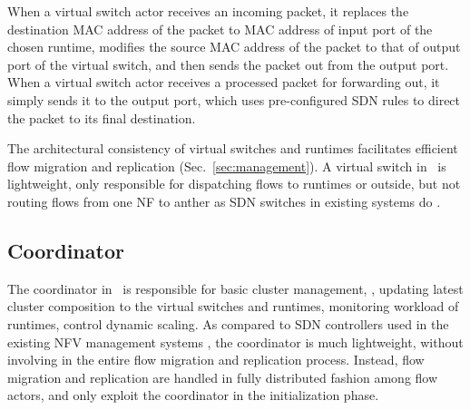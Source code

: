 When a virtual switch actor receives an incoming packet, it replaces the destination MAC address of the packet to MAC address of input port of the chosen runtime, modifies the source MAC address of the packet to that of output port of the virtual switch, and then sends the packet out from the output port. When a virtual switch actor receives a processed packet for forwarding out, %
 it simply sends it to the output port, which uses pre-configured SDN rules to direct the packet to its final destination. %


The architectural consistency of virtual switches and runtimes facilitates efficient flow migration and replication (Sec.~\ref{sec:management}). %
 A virtual switch in \nfactor~is lightweight, only responsible for dispatching flows to runtimes or outside, but not routing flows from one NF to anther as SDN switches in existing systems do \cite{gember2012stratos, gember2015opennf}.





\subsection{Coordinator}
\label{sec:coordinator}

The coordinator in \nfactor~is responsible for basic cluster management, %
\eg, updating latest cluster composition to the virtual switches and runtimes, monitoring workload of runtimes, control dynamic scaling. %
As compared to SDN controllers used in the existing NFV management systems \cite{gember2015opennf, rajagopalan2013split}%
, the coordinator is much lightweight, without involving in the entire flow migration and replication process.%
 Instead, flow migration and replication are handled in fully distributed fashion among flow actors, and only exploit the coordinator in the initialization phase.

